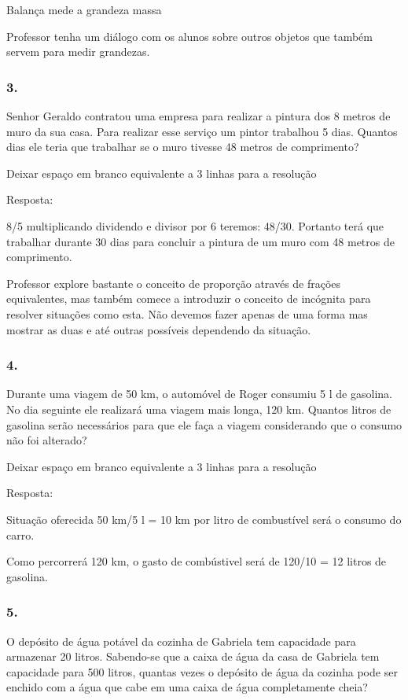 Balança mede a grandeza massa

Professor tenha um diálogo com os alunos sobre outros objetos que também
servem para medir grandezas.

\subsubsection{3.}\label{section-119}

Senhor Geraldo contratou uma empresa para realizar a pintura dos 8
metros de muro da sua casa. Para realizar esse serviço um pintor
trabalhou 5 dias. Quantos dias ele teria que trabalhar se o muro tivesse
48 metros de comprimento?

Deixar espaço em branco equivalente a 3 linhas para a resolução

Resposta:

8/5 multiplicando dividendo e divisor por 6 teremos: 48/30. Portanto
terá que trabalhar durante 30 dias para concluir a pintura de um muro
com 48 metros de comprimento.

Professor explore bastante o conceito de proporção através de frações
equivalentes, mas também comece a introduzir o conceito de incógnita
para resolver situações como esta. Não devemos fazer apenas de uma forma
mas mostrar as duas e até outras possíveis dependendo da situação.

\subsubsection{4.}\label{section-120}

Durante uma viagem de 50 km, o automóvel de Roger consumiu 5 l de
gasolina. No dia seguinte ele realizará uma viagem mais longa, 120 km.
Quantos litros de gasolina serão necessários para que ele faça a viagem
considerando que o consumo não foi alterado?

Deixar espaço em branco equivalente a 3 linhas para a resolução

Resposta:

Situação oferecida 50 km/5 l = 10 km por litro de combustível será o
consumo do carro.

Como percorrerá 120 km, o gasto de combústivel será de 120/10 = 12
litros de gasolina.

\subsubsection{5.}\label{section-121}

O depósito de água potável da cozinha de Gabriela tem capacidade para
armazenar 20 litros. Sabendo-se que a caixa de água da casa de Gabriela
tem capacidade para 500 litros, quantas vezes o depósito de água da
cozinha pode ser enchido com a água que cabe em uma caixa de água
completamente cheia?

